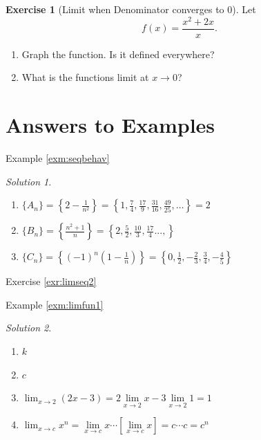 \documentclass[
]{book}
\providecommand{\tightlist}{%
  \setlength{\itemsep}{0pt}\setlength{\parskip}{0pt}}
\theoremstyle{definition}
\theoremstyle{definition}
\theoremstyle{definition}
\newtheorem{exercise}{Exercise}[chapter]
\theoremstyle{remark}
\newtheorem*{solution}{Solution}
\begin{document}
\begin{exercise}[Limit when Denominator converges to 0]
\protect\hypertarget{exr:discontdraw}{}{\label{exr:discontdraw} {} }
Let \[f(x) = \frac{x^2 + 2x}{x}.\]

\begin{enumerate}
\def\labelenumi{\arabic{enumi}.}
\tightlist
\item
  Graph the function. Is it defined everywhere?
\item
  What is the functions limit at \(x \rightarrow 0\)?
\end{enumerate}
\end{exercise}

\hypertarget{answers-to-examples}{%
\section*{Answers to Examples}\label{answers-to-examples}}

Example \ref{exm:seqbehav}

\begin{solution}
{}

\begin{enumerate}
\def\labelenumi{\arabic{enumi}.}
\tightlist
\item
  \(\{A_n\}=\left\{ 2-\frac{1}{n^2} \right\} = \left\{1, \frac{7}{4}, \frac{17}{9}, \frac{31}{16}, \frac{49}{25}, \ldots\right\} = 2\)
\item
  \(\{B_n\}=\left\{\frac{n^2+1}{n} \right\} = \left\{2, \frac{5}{2}, \frac{10}{3}, \frac{17}{4}..., \right\}\)
\item
  \(\{C_n\}=\left\{(-1)^n \left(1-\frac{1}{n}\right) \right\} = \left\{0, \frac{1}{2}, -\frac{2}{3}, \frac{3}{4}, -\frac{4}{5}\right\}\)
\end{enumerate}
\end{solution}

Exercise \ref{exr:limseq2}

Example \ref{exm:limfun1}

\begin{solution}
{}

\begin{enumerate}
\def\labelenumi{\arabic{enumi}.}
\tightlist
\item
  \(k\)
\item
  \(c\)
\item
  \(\lim_{x\to 2} (2x-3) = 2\lim\limits_{x\to 2} x - 3\lim\limits_{x\to 2} 1 = 1\)
\item
  \(\lim_{x \to c} x^n = \lim\limits_{x \to c} x \cdots[\lim\limits_{x \to c} x] = c\cdots c =c^n\)
\end{enumerate}
\end{solution}
\end{document}
